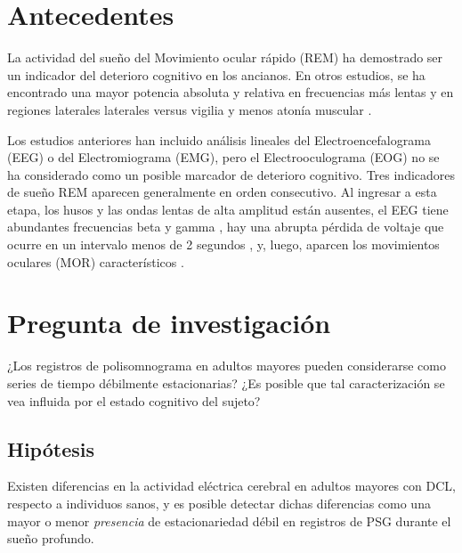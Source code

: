 \section{Antecedentes}

La actividad del sueño del Movimiento ocular rápido (REM) ha demostrado ser un indicador del deterioro cognitivo en los ancianos. En otros estudios, se ha encontrado una mayor potencia absoluta y relativa en frecuencias más lentas y en regiones laterales laterales versus vigilia \cite{Brayet} y menos atonía muscular \cite{Chen}.


Los estudios anteriores han incluido análisis lineales del Electroencefalograma (EEG) o del Electromiograma (EMG), pero el Electrooculograma (EOG) no se ha considerado como un posible marcador de deterioro cognitivo. Tres indicadores de sueño REM aparecen generalmente en orden consecutivo. Al ingresar a esta etapa, los husos y las ondas lentas de alta amplitud están ausentes, el EEG tiene abundantes frecuencias beta y gamma \cite{SteriadeIntracortical1996,Llinas}, hay una abrupta pérdida de voltaje que ocurre en un intervalo menos de 2 segundos \cite{Rosales-Lagarde2009}, y, luego, aparcen los movimientos oculares (MOR) característicos \cite{Aserinsky,AASM2007,Rechtshaffen1968}.


\section{Pregunta de investigación}

¿Los registros de polisomnograma en adultos mayores pueden considerarse como series de tiempo 
débilmente estacionarias?
%
¿Es posible que tal caracterización se vea influida por el estado cognitivo del sujeto?


\subsection{Hipótesis}

Existen diferencias en la actividad eléctrica cerebral en adultos mayores con DCL, respecto a 
individuos sanos, y es posible detectar dichas diferencias como una mayor o menor 
\textit{presencia} de estacionariedad débil en registros de PSG durante el sueño profundo.

